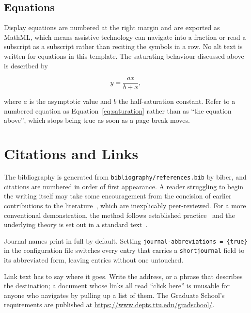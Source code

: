 \subsection{Equations}
Display equations are numbered at the right margin and are exported as MathML,
which means assistive technology can navigate into a fraction or read a
subscript as a subscript rather than reciting the symbols in a row. No alt
text is written for equations in this template. The saturating behaviour
discussed above is described by

\begin{equation}
  y = \frac{a x}{b + x},
  \label{eq:saturation}
\end{equation}

where $a$ is the asymptotic value and $b$ the half-saturation constant.
Refer to a numbered equation as Equation~\eqref{eq:saturation} rather than as
``the equation above'', which stops being true as soon as a page break moves.

\section{Citations and Links}
The bibliography is generated from \verb|bibliography/references.bib| by
biber, and citations are numbered in order of first appearance. A reader
struggling to begin the writing itself may take some encouragement from the
concision of earlier contributions to the
literature~\cite{upper1974}, which are inexplicably peer-reviewed. For a more 
conventional demonstration, the method
follows established practice~\cite{example-article} and the underlying theory
is set out in a standard text~\cite{example-book}.

Journal names print in full by default. Setting
\verb|journal-abbreviations = {true}| in the configuration file switches every
entry that carries a \verb|shortjournal| field to its abbreviated form,
leaving entries without one untouched.

Link text has to say where it goes. Write the address, or a phrase that
describes the destination; a document whose links all read ``click here'' is
unusable for anyone who navigates by pulling up a list of them. The Graduate
School's requirements are published at
\url{https://www.depts.ttu.edu/gradschool/}.
